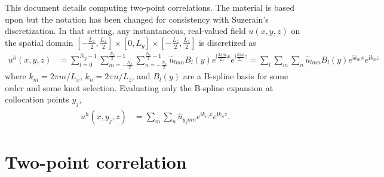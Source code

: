\documentclass[letterpaper,11pt,nointlimits,reqno]{amsart}
\newcommand{\ii}{\ensuremath{\mathrm{i}}}
\begin{document}
This document details computing two-point correlations.  The material is based
upon \citet[\textsection{}6.4--5]{Pope2000Turbulent} but the notation has been
changed for consistency with Suzerain's discretization.  In that setting, any
instantaneous, real-valued field $u\!\left(x,y,z\right)$ on the spatial domain
$\left[-\frac{L_x}{2},\frac{L_x}{2}\right] \times{} [0,L_y] \times{}
\left[-\frac{L_z}{2},\frac{L_z}{2}\right]$ is discretized as
\begin{align}
  u^h(x,y,z)
&=
  \sum_{l=0}^{N_y - 1}
  \sum_{m=-\frac{N_x}{2}}^{\frac{N_x}{2}-1}
  \sum_{n=-\frac{N_z}{2}}^{\frac{N_z}{2}-1}
  \hat{u}_{l m n}
  B_l\!\left(y\right)
  e^{\ii\frac{2\pi{}m}{L_x}x}
  e^{\ii\frac{2\pi{}n}{L_z}z}
=
  \sum_{l}\sum_{m}\sum_{n}
  \hat{u}_{l m n}B_l\!\left(y\right)e^{\ii k_m x}e^{\ii k_n z}
\end{align}
where $k_m = 2\pi{}m/L_x$, $k_n = 2\pi{}n/L_z$, and $B_l\!\left(y\right)$ are a
B-spline basis for some order and some knot selection.  Evaluating only the
B-spline expansion at collocation points $y_j$,
\begin{align}
  u^h(x,y_j,z)
  &=
  \sum_{m}\sum_{n}
  \hat{u}_{y_j m n} e^{\ii k_m x}e^{\ii k_n z}.
\end{align}

\section{Two-point correlation
         \citep[\textsection{}6.3]{Pope2000Turbulent}}
\end{document}
